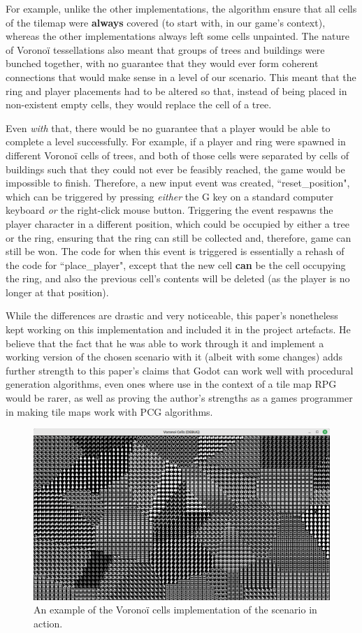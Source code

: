 For example, unlike the other implementations, the algorithm ensure that all cells of the tilemap were \textbf{always} covered (to start with, in our game's context), whereas the other implementations always left some cells unpainted. The nature of Voronoï tessellations also meant that groups of trees and buildings were bunched together, with no guarantee that they would ever form coherent connections that would make sense in a level of our scenario. This meant that the ring and player placements had to be altered so that, instead of being placed in non-existent empty cells, they would replace the cell of a tree.

Even \textit{with} that, there would be no guarantee that a player would be able to complete a level successfully. For example, if a player and ring were spawned in different Voronoï cells of trees, and both of those cells were separated by cells of buildings such that they could not ever be feasibly reached, the game would be impossible to finish. Therefore, a new input event was created, ``reset\_position", which can be triggered by pressing \textit{either} the G key on a standard computer keyboard \textit{or} the right-click mouse button. Triggering the event respawns the player character in a different position, which could be occupied by either a tree or the ring, ensuring that the ring can still be collected and, therefore, game can still be won. The code for when this event is triggered is essentially a rehash of the code for ``place\_player", except that the new cell \textbf{can} be the cell occupying the ring, and also the previous cell's contents will be deleted (as the player is no longer at that position).

While the differences are drastic and very noticeable, this paper's nonetheless kept working on this implementation and included it in the project artefacts. He believe that the fact that he was able to work through it and implement a working version of the chosen scenario with it (albeit with some changes) adds further strength to this paper's claims that Godot can work well with procedural generation algorithms, even ones where use in the context of a tile map RPG would be rarer, as well as proving the author's strengths as a games programmer in making tile maps work with PCG algorithms.

\begin{figure}[H]
    \centering
    \includegraphics[width=\textwidth]{Images/voronoi-example.png}
    \caption{An example of the Voronoï cells implementation of the scenario in action.}
    \label{fig:voronoi-example}
\end{figure}
